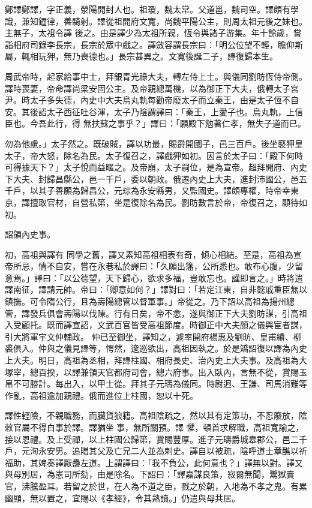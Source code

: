 \begin{pinyinscope}
 鄭譯鄭譯，字正義，滎陽開封人也。祖瓊，魏太常。父道邕，魏司空。譯頗有學識，兼知鐘律，善騎射。譯從祖開府文寬，尚魏平陽公主，則周太祖元後之妹也。主無子，太祖令譯
 後之。由是譯少為太祖所親，恆令與諸子游集。年十餘歲，嘗詣相府司錄李長宗，長宗於眾中戲之。譯斂容謂長宗曰：「明公位望不輕，瞻仰斯屬，輒相玩狎，無乃喪德也。」長宗甚異之。文寬後誕二子，譯復歸本生。



 周武帝時，起家給事中士，拜銀青光祿大夫，轉左侍上士。與儀同劉昉恆侍帝側。譯時喪妻，帝命譯尚梁安固公主。及帝親總萬機，以為御正下大夫，俄轉太子宮尹。時太子多失德，內史中大夫烏丸軌每勸帝廢太子而立秦王，由是太子恆不自安。其後詔太子西征吐谷渾，太子乃陰謂譯曰：「秦王，上愛子也。烏丸軌，上信臣也。今吾此行，得
 無扶蘇之事乎？」譯曰：「願殿下勉著仁孝，無失子道而已。



 勿為他慮。」太子然之。既破賊，譯以功最，賜爵開國子，邑三百戶。後坐褻狎皇太子，帝大怒，除名為民。太子復召之，譯戲狎如初。因言於太子曰：「殿下何時可得據天下？」太子悅而益暱之。及帝崩，太子嗣位，是為宣帝。超拜開府、內史下大夫、封歸昌縣公，邑一千戶，委以朝政。俄遷內史上大夫，進封沛國公，邑五千戶，以其子善願為歸昌公，元琮為永安縣男，又監國史。譯頗專權，時帝幸東京，譯擅取官材，自營私第，坐是復除名為民。劉昉數言於帝，帝復召之，顧待如初。



 詔領內史事。



 初，高祖與譯有
 同學之舊，譯又素知高祖相表有奇，傾心相結。至是，高祖為宣帝所忌，情不自安，嘗在永巷私於譯曰：「久願出籓，公所悉也。敢布心腹，少留意焉。」譯曰：「以公德望，天下歸心，欲求多福，豈敢忘也。謹即言之。」時將遣譯南征，譯請元帥。帝曰：「卿意如何？」譯對曰：「若定江東，自非懿戚重臣無以鎮撫。可令隋公行，且為壽陽總管以督軍事。」帝從之。乃下詔以高祖為揚州總管，譯發兵俱會壽陽以伐陳。行有日矣，帝不悆，遂與御正下大夫劉昉謀，引高祖入受顧托。既而譯宣詔，文武百官皆受高祖節度。時御正中大夫顏之儀與宦者謀，引大將軍宇文仲輔政。
 仲已至御坐，譯知之，遽率開府楊惠及劉昉、皇甫績、柳裘俱入。仲與之儀見譯等，愕然，逡巡欲出，高祖因執之。於是矯詔復以譯為內史上大夫。明日，高祖為丞相，拜譯柱國、相府長史、治內史上大夫事。及高祖為大塚宰，總百揆，以譯兼領天官都府司會，總六府事。出入臥內，言無不從，賞賜玉帛不可勝計。每出入，以甲士從。拜其子元璹為儀同。時尉迥、王謙、司馬消難等作亂，高祖逾加親禮。俄而進位上柱國，恕以十死。



 譯性輕險，不親職務，而臟貨狼籍。高祖陰疏之，然以其有定策功，不忍廢放，陰敕官屬不得白事於譯。譯猶坐事，無所關預。譯
 懼，頓首求解職，高祖寬諭之，接以恩禮。及上受禪，以上柱國公歸第，賞賜豐厚。進子元璹爵城皋郡公，邑二千戶，元洵永安男。追贈其父及亡兄二人並為刺史。譯自以被疏，陰呼道士章醮以祈福助，其婢奏譯厭蠱左道。上謂譯曰：「我不負公，此何意也？」譯無以對。譯又與母別居，為憲司所劾，由是除名。下詔曰：「譯嘉謀良策，寂爾無聞，鬻獄賣官，沸騰盈耳。若留之於世，在人為不道之臣，戮之於朝，入地為不孝之鬼。有累幽顯，無以置之，宜賜以《孝經》，令其熟讀。」仍遣與母共居。




\end{pinyinscope}
